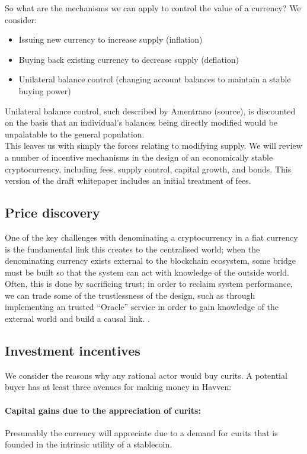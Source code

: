 \noindent So what are the mechanisms we can apply to control the value of a currency? We consider:

\begin{itemize}
    \item Issuing new currency to increase supply (inflation)
    \item Buying back existing currency to decrease supply (deflation)
    \item Unilateral balance control (changing account balances to maintain a stable buying power)
\end{itemize}

\noindent Unilateral balance control, such described by Amentrano (source), is discounted on the basis that an individual's balances being directly modified would be unpalatable to the general population. \\

\noindent This leaves us with simply the forces relating to modifying supply. We will review a number of incentive mechanisms in the design of an economically stable cryptocurrency, including fees, supply control, capital growth, and bonds. This version of the draft whitepaper includes an initial treatment of fees.

\subsection{Price discovery}

One of the key challenges with denominating a cryptocurrency in a fiat currency is the fundamental link this creates to the centralised world; when the denominating currency exists external to the blockchain ecosystem, some bridge must be built so that the system can act with knowledge of the outside world. Often, this is done by sacrificing trust; in order to reclaim system performance, we can trade some of the trustlessness of the design, such as through implementing an trusted ``Oracle'' service in order to gain knowledge of the external world and build a causal link. \cite{brooks2017blog}.

\subsection{Investment incentives}

We consider the reasons why any rational actor would buy curits. A potential buyer has at least three avenues for making money in Havven:

\paragraph{Capital gains due to the appreciation of curits:}
Presumably the currency will appreciate due to a demand for curits that is founded in the intrinsic utility of a stablecoin.

